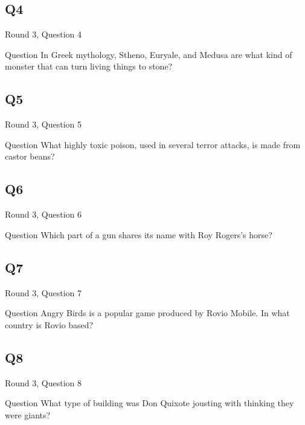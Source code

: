 \documentclass[11pt]{beamer}
\begin{document}
\subsection*{Q4}
\begin{frame}[t]{Round 3, Question 4}
\vspace{2em}
\begin{block}{Question}
In Greek mythology, Stheno, Euryale, and Medusa are what kind of monster that can turn living things to stone\@?
\end{block}
\end{frame}
    

\subsection*{Q5}
\begin{frame}[t]{Round 3, Question 5}
\vspace{2em}
\begin{block}{Question}
What highly toxic poison, used in several terror attacks, is made from castor beans\@?
\end{block}
\end{frame}
    

\subsection*{Q6}
\begin{frame}[t]{Round 3, Question 6}
\vspace{2em}
\begin{block}{Question}
Which part of a gun shares its name with Roy Rogers's horse\@?
\end{block}
\end{frame}
    

\subsection*{Q7}
\begin{frame}[t]{Round 3, Question 7}
\vspace{2em}
\begin{block}{Question}
Angry Birds is a popular game produced by Rovio Mobile. In what country is Rovio based\@?
\end{block}
\end{frame}
    

\subsection*{Q8}
\begin{frame}[t]{Round 3, Question 8}
\vspace{2em}
\begin{block}{Question}
What type of building was Don Quixote jousting with thinking they were giants\@?
\end{block}
\end{frame}
    
\end{document}
